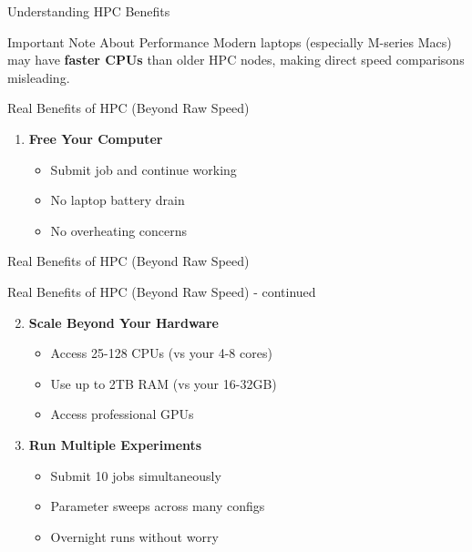 \documentclass[aspectratio=169]{beamer}
\begin{document}
\begin{frame}{Understanding HPC Benefits}
\begin{alertblock}{Important Note About Performance}
Modern laptops (especially M-series Macs) may have \textbf{faster CPUs} than older HPC nodes, making direct speed comparisons misleading.
\end{alertblock}

\begin{block}{Real Benefits of HPC (Beyond Raw Speed)}
\begin{enumerate}
    \item \textbf{Free Your Computer}
    \begin{itemize}
        \item Submit job and continue working
        \item No laptop battery drain
        \item No overheating concerns
    \end{itemize}
\end{enumerate}
\end{block}
\end{frame}

\begin{frame}{Real Benefits of HPC (Beyond Raw Speed)}
\begin{block}{Real Benefits of HPC (Beyond Raw Speed) - continued}
\begin{enumerate}
    \setcounter{enumi}{1}
    \item \textbf{Scale Beyond Your Hardware}
    \begin{itemize}
        \item Access 25-128 CPUs (vs your 4-8 cores)
        \item Use up to 2TB RAM (vs your 16-32GB)
        \item Access professional GPUs
    \end{itemize}
    
    \item \textbf{Run Multiple Experiments}
    \begin{itemize}
        \item Submit 10 jobs simultaneously
        \item Parameter sweeps across many configs
        \item Overnight runs without worry
    \end{itemize}
\end{enumerate}
\end{block}
\end{frame}
\end{document}
